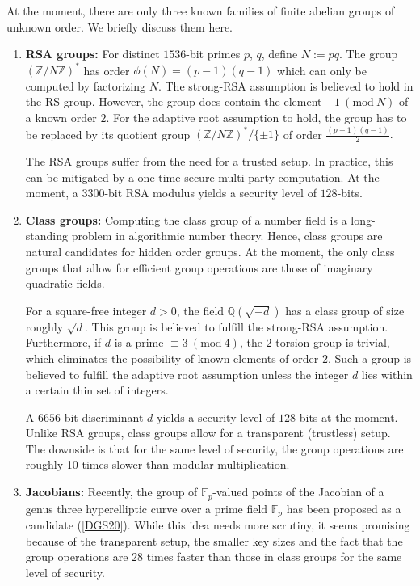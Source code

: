 \documentclass[11pt, lettersize, notitlepage, leqno, footskip=0.6cm]{article}
\newcommand{\bz}{\mathbb Z}
\newcommand{\bq}{\mathbb Q}
\newcommand{\bFp}{\mathbb{F}_p}
\newcommand{\vs}{\vspace{-0.15cm}}
\newcommand{\Mod}[1]{\ (\mathrm{mod}\ #1)}
\numberwithin{equation}{section}
\begin{document}
At the moment, there are only three known families of finite abelian groups of unknown order. We briefly discuss them here.\vspace{0.2cm} \begin{enumerate}[wide, labelwidth=!, labelindent=0pt] \vs

\item \textbf{RSA groups:} For distinct $1536$-bit primes $p$, $q$, define $N:= pq$. The group $(\bz/N\bz)^*$ has order $\phi(N) = (p-1)(q-1)$ which can only be computed by factorizing $N$. The strong-RSA assumption is believed to hold in the RS group. However, the group does contain the element $-1\Mod{N}$ of a known order $2$. For the adaptive root assumption to hold, the group has to be replaced by its quotient group $(\bz/N\bz)^*/\{\pm 1\}$ of order $\frac{(p-1)(q-1)}{2}.$ 

The RSA groups suffer from the need for a trusted setup. In practice, this can be mitigated by a one-time secure multi-party computation. At the moment, a $3300$-bit RSA modulus yields a security level of $128$-bits.


\item \textbf{Class groups:} Computing the class group of a number field is a long-standing problem in algorithmic number theory. Hence, class groups are natural candidates for hidden order groups. At the moment, the only class groups that allow for efficient group operations are those of imaginary quadratic fields.

For a square-free integer $d > 0$, the field $\bq(\sqrt{-d})$ has a class group of size roughly $\sqrt{d}$. This group is believed to fulfill the strong-RSA assumption. Furthermore, if $d$ is a prime $\equiv 3 \Mod{4}$, the $2$-torsion group is trivial, which eliminates the possibility of known elements of order $2$. Such a group is believed to fulfill the adaptive root assumption unless the integer $d$ lies within a certain thin set of integers.

A $6656$-bit discriminant $d$ yields a security level of $128$-bits at the moment. Unlike RSA groups, class groups allow for a transparent (trustless) setup. The downside is that for the same level of security, the group operations are roughly 10 times slower than modular multiplication.

\item \textbf{Jacobians:} Recently, the group of $\bFp$-valued points of the Jacobian of a genus three hyperelliptic curve over a prime field $\bFp$ has been proposed as a candidate (\hyperlink{DGS20}{[DGS20]}). While this idea needs more scrutiny, it seems promising because of the transparent setup, the smaller key sizes and the fact that the group operations are 28 times faster than those in class groups for the same level of security.


\end{enumerate}
\end{document}
